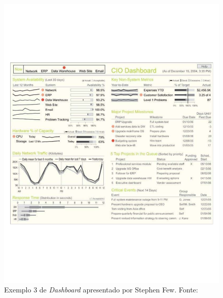 \begin{figure}[]
\centering
\includegraphics[scale=0.50]{dashboard3}
\caption{Exemplo 3 de \textit{Dashboard} apresentado por Stephen Few. Fonte: \cite{book_design}}
\label{img:dashboard3}
\end{figure}

